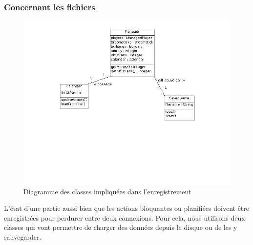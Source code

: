 \documentclass[a4paper,titlepage]{scrreprt}
\begin{document}
\begin{itemize}
  \subsubsection{Concernant les fichiers}
    \begin{figure}[H]
    \center
    \includegraphics[scale=0.4]{uml/class/Fichiers.png}
    \caption{Diagramme des classes impliquées dans l'enregistrement}
    \end{figure}	
  L'état d'une partie aussi bien que les actions bloquantes ou planifiées doivent
  être enregistrées pour perdurer entre deux connexions. Pour cela, nous utilisons
  deux classes qui vont permettre de charger des données depuis le disque ou
  de les y sauvegarder.

\end{itemize}
\end{document}
